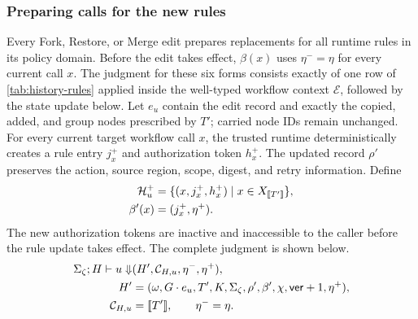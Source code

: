 \subsubsection{Preparing calls for the new rules}

Every Fork, Restore, or Merge edit prepares replacements for all runtime rules in its policy domain.
Before the edit takes effect, \(\beta(x)\) uses \(\eta^-=\eta\) for every current call \(x\).
The judgment for these six forms consists exactly of one row of \cref{tab:history-rules} applied inside the well-typed workflow context \(\mathcal E\), followed by the state update below.
Let \(e_u\) contain the edit record and exactly the copied, added, and group nodes prescribed by \(T'\); carried node IDs remain unchanged.
For every current target workflow call \(x\), the trusted runtime deterministically creates a rule entry \(j_x^+\) and authorization token \(h_x^+\).
The updated record \(\rho'\) preserves the action, source region, scope, digest, and retry information.
Define
\[
\begin{aligned}
 \mathcal H_u^+
   &=\{(x,j_x^+,h_x^+)\mid x\in X_{\mathopen{[\![}T'\mathclose{]\!]}}\},\\
 \beta'(x)&=(j_x^+,\eta^+).
\end{aligned}
\]
The new authorization tokens are inactive and inaccessible to the caller before the rule update takes effect.
The complete judgment is shown below.
\begin{equation}
\label{eq:derived-cut}
\begin{aligned}
 \Sigma_\zeta;H\vdash u\Downarrow
   &(H',\mathcal C_{H,u},\eta^-,\eta^+),\\
 H'&=(\omega,G\mathbin{\cdot}e_u,T',K,\Sigma_\zeta,
      \rho',\beta',\chi,\mathsf{ver}+1,\eta^+),\\
 \mathcal C_{H,u}&=\mathopen{[\![}T'\mathclose{]\!]},\qquad \eta^-=\eta .
\end{aligned}
\end{equation}
